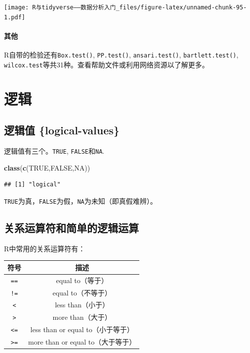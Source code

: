 \documentclass[]{book}
\newenvironment{Shaded}{\begin{snugshade}}{\end{snugshade}}
\newcommand{\KeywordTok}[1]{\textcolor[rgb]{0.13,0.29,0.53}{\textbf{#1}}}
\newcommand{\NormalTok}[1]{#1}
\newcommand{\OtherTok}[1]{\textcolor[rgb]{0.56,0.35,0.01}{#1}}
\let\oldparagraph\paragraph
\renewcommand{\paragraph}[1]{\oldparagraph{#1}\mbox{}}
\begin{document}
\texttt{[image: R与tidyverse——数据分析入门\_files/figure-latex/unnamed-chunk-95-1.pdf]}

\paragraph{其他}

R自带的检验还有\texttt{Box.test()}, \texttt{PP.test()}, \texttt{ansari.test()}, \texttt{bartlett.test()}, \texttt{wilcox.test}等共31种。查看帮助文件或利用网络资源以了解更多。

\hypertarget{logical-operation}{%
\section{逻辑}\label{logical-operation}}

\hypertarget{-logical-values}{%
\subsection{逻辑值 \{logical-values\}}\label{-logical-values}}

逻辑值有三个。\texttt{TRUE}, \texttt{FALSE}和\texttt{NA}.

\begin{Shaded}
\begin{Highlighting}[]
\KeywordTok{class}\NormalTok{(}\KeywordTok{c}\NormalTok{(}\OtherTok{TRUE}\NormalTok{,}\OtherTok{FALSE}\NormalTok{,}\OtherTok{NA}\NormalTok{))}
\end{Highlighting}
\end{Shaded}

\begin{verbatim}
## [1] "logical"
\end{verbatim}

\texttt{TRUE}为真，\texttt{FALSE}为假，\texttt{NA}为未知（即真假难辨）。

\hypertarget{relational-operators}{%
\subsection{关系运算符和简单的逻辑运算}\label{relational-operators}}

R中常用的关系运算符有：

\begin{longtable}[]{@{}cc@{}}
\toprule
符号 & 描述\tabularnewline
\midrule
\endhead
\texttt{==} & equal to（等于）\tabularnewline
\texttt{!=} & equal to（不等于）\tabularnewline
\texttt{\textless{}} & less than（小于）\tabularnewline
\texttt{\textgreater{}} & more than（大于）\tabularnewline
\texttt{\textless{}=} & less than or equal to（小于等于）\tabularnewline
\texttt{\textgreater{}=} & more than or equal to（大于等于）\tabularnewline
\bottomrule
\end{longtable}
\end{document}

